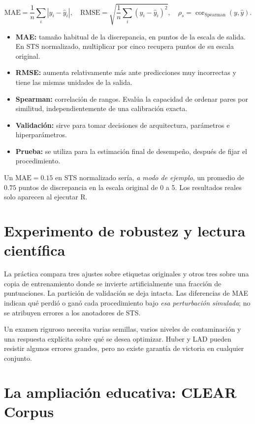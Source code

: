 \documentclass[11pt,a4paper]{article}
\begin{document}
\[
 \mathrm{MAE}=\frac1n\sum_i |y_i-\widehat y_i|,
 \quad
 \mathrm{RMSE}=\sqrt{\frac1n\sum_i(y_i-\widehat y_i)^2},
 \quad
 \rho_s=\operatorname{cor}_{\mathrm{Spearman}}(y,\widehat y).
\]

\begin{itemize}
 \item \textbf{MAE:} tamaño habitual de la discrepancia, en puntos de la escala de salida. En STS normalizado, multiplicar por cinco recupera puntos de su escala original.
 \item \textbf{RMSE:} aumenta relativamente más ante predicciones muy incorrectas y tiene las mismas unidades de la salida.
 \item \textbf{Spearman:} correlación de rangos. Evalúa la capacidad de ordenar pares por similitud, independientemente de una calibración exacta.
 \item \textbf{Validación:} sirve para tomar decisiones de arquitectura, parámetros e hiperparámetros.
 \item \textbf{Prueba:} se utiliza para la estimación final de desempeño, después de fijar el procedimiento.
\end{itemize}

Un \(\mathrm{MAE}=0.15\) en STS normalizado sería, \emph{a modo de ejemplo}, un promedio de \(0.75\) puntos de discrepancia en la escala original de 0 a 5. Los resultados reales solo aparecen al ejecutar R.

\section{Experimento de robustez y lectura científica}

La práctica compara tres ajustes sobre etiquetas originales y otros tres sobre una copia de entrenamiento donde se invierte artificialmente una fracción de puntuaciones. La partición de validación se deja intacta. Las diferencias de MAE indican qué perdió o ganó cada procedimiento bajo \emph{esa perturbación simulada}; no se atribuyen errores a los anotadores de STS.

Un examen riguroso necesita varias semillas, varios niveles de contaminación y una respuesta explícita sobre qué se desea optimizar. Huber y LAD pueden resistir algunos errores grandes, pero no existe garantía de victoria en cualquier conjunto.

\section{La ampliación educativa: CLEAR Corpus}
\end{document}
